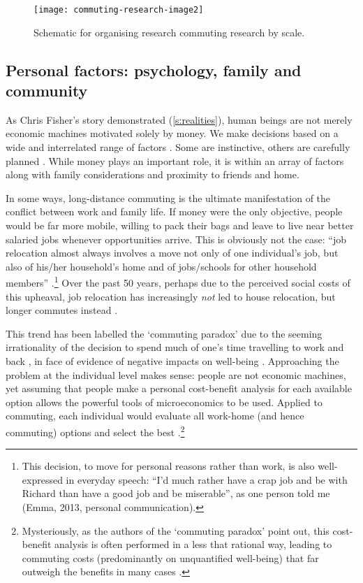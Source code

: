 \begin{figure}[htbp]
  \centerline{
    \texttt{[image: commuting-research-image2]}}
  \caption{Schematic
for organising research commuting research by scale.} %
  \label{fig:com-pyramid}
\end{figure}

\subsection{Personal factors: psychology, family and community}
As Chris Fisher's story demonstrated (\cref{s:realities}), human beings are not
merely economic machines motivated solely by money. We make decisions based on
a wide and interrelated range of factors \citep{Pinker1997}. Some are instinctive, others
are carefully planned \citep{Kahneman2012}. 
While money plays an important role, it is within an array of 
factors along with family considerations and proximity to friends and home.

In some ways, long-distance commuting is the ultimate
manifestation of the conflict between
work and family life. If money were the only objective, people would be far more
mobile, willing to pack their bags and leave to live near better salaried jobs
whenever opportunities arrive. This is obviously not the case:
``job relocation almost always involves a move not only of one
individual's job, but also of his/her household's home and of jobs/schools for other
household members''
\citep[p.~52]{Green-1999-ld-commute}.\footnote{This
decision, to move for personal reasons rather than work,
is also well-expressed in everyday speech:
``I'd much rather
have a crap job and be with Richard than have a good job and be miserable'', as one
person told me (Emma, 2013, personal communication).
}
Over the past 50 years, perhaps due to the perceived social costs
of this upheaval, job relocation has increasingly
\emph{not} led to house relocation, but longer commutes instead
\citep{Green-1999-ld-commute, Nielsen2008}.

This trend has been labelled the `commuting paradox' due to the
seeming irrationality of the decision 
to spend much of one's time travelling to work and back \citep{Stutzer2008},
in face of evidence of negative impacts on well-being \citep{novaco1990objective}.
Approaching the problem at the individual level makes sense:
people are not economic machines,
yet assuming that people make a personal cost-benefit analysis for each
available option allows the powerful tools of microeconomics to be used. Applied to
commuting, each individual would evaluate all work-home (and
hence commuting) options and select the
best \citep{Stutzer2008}.\footnote{Mysteriously,
as the authors of the `commuting paradox' point out, this cost-benefit analysis is often
performed in a less that rational way, leading to commuting costs
(predominantly on unquantified well-being) that far outweigh the benefits
in many cases \citep{Stutzer2008}.
}

